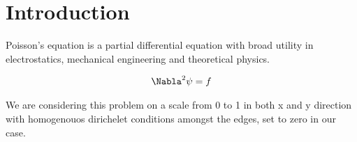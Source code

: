\section{Introduction}
Poisson's equation is a partial differential equation with broad utility in
electrostatics, mechanical engineering and theoretical physics.\cite{wiki}

\begin{align}
	\Nabla^2 \psi &= f \\
\end{align}

We are considering this problem on a scale from 0 to 1 in both x and y
direction with homogenouos dirichelet conditions amongst the edges, set to zero
in our case. 
